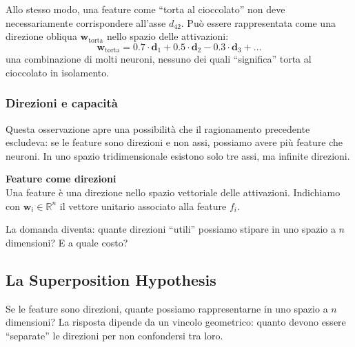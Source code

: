 Allo stesso modo, una feature come ``torta al cioccolato'' non deve necessariamente corrispondere all'asse $d_{42}$. Può essere rappresentata come una direzione obliqua $\mathbf{w}_{\text{torta}}$ nello spazio delle attivazioni:
\begin{equation}
    \mathbf{w}_{\text{torta}} = 0.7 \cdot \mathbf{d}_1 + 0.5 \cdot \mathbf{d}_2 - 0.3 \cdot \mathbf{d}_3 + \dots
\end{equation}
una combinazione di molti neuroni, nessuno dei quali ``significa'' torta al cioccolato in isolamento.
\subsubsection{Direzioni e capacità}
Questa osservazione apre una possibilità che il ragionamento precedente escludeva: se le feature sono direzioni e non assi, possiamo avere più feature che neuroni. In uno spazio tridimensionale esistono solo tre assi, ma infinite direzioni.
\begin{notebox}
\textbf{Feature come direzioni}\\
Una feature è una direzione nello spazio vettoriale delle attivazioni. Indichiamo con $\mathbf{w}_i \in \mathbb{R}^{n}$ il vettore unitario associato alla feature $f_i$.
\end{notebox}
La domanda diventa: quante direzioni ``utili'' possiamo stipare in uno spazio a $n$ dimensioni? E a quale costo?
\subsection{La Superposition Hypothesis}
\label{subsec:superposition_hypothesis}
Se le feature sono direzioni, quante possiamo rappresentarne in uno spazio a $n$ dimensioni? La risposta dipende da un vincolo geometrico: quanto devono essere ``separate'' le direzioni per non confondersi tra loro.
